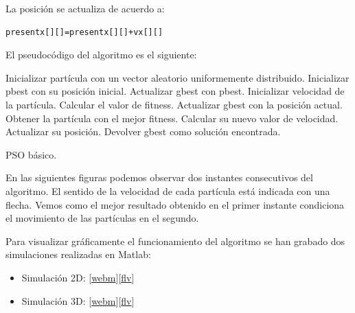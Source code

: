 \documentclass[a4paper,12pt,titlepage]{article}
\begin{document}
La posición se actualiza de acuerdo a:

\begin{lstlisting}
presentx[][]=presentx[][]+vx[][]
\end{lstlisting}

El pseudocódigo del algoritmo es el siguiente:
\newpage

\begin{algorithm}[!ht]
	\begin{algorithmic}[1]
		\STATE Inicializar partícula con un vector aleatorio uniformemente distribuido.
		\STATE Inicializar pbest con su posición inicial.
			\STATE Actualizar gbest con pbest.
		\ENDIF
		\STATE Inicializar velocidad de la partícula.
	\ENDFOR
	\REPEAT 
			\STATE Calcular el valor de fitness.
				\STATE Actualizar gbest con la posición actual.
			\ENDIF
		\ENDFOR
		\STATE Obtener la partícula con el mejor fitness.
			\STATE Calcular su nuevo valor de velocidad.
			\STATE Actualizar su posición.
		\ENDFOR		
	\STATE Devolver gbest como solución encontrada.
	\end{algorithmic}
\caption{PSO básico.}
\label{alg:algoritmoRaro}
\end{algorithm}

En las siguientes figuras podemos observar dos instantes consecutivos del algoritmo. El sentido de la velocidad de cada partícula está indicada con una flecha. Vemos como el mejor resultado obtenido en el primer instante condiciona el movimiento de las partículas en el segundo.

Para visualizar gráficamente el funcionamiento del algoritmo se han grabado dos simulaciones realizadas en Matlab:

\begin{itemize}[noitemsep]
	\item Simulación 2D: [\href{https://raw.githubusercontent.com/davidmigloz/evolutionary-computation/master/T1_PSO/res/pso_demo_3d.webm}{webm}][\href{https://raw.githubusercontent.com/davidmigloz/evolutionary-computation/master/T1_PSO/res/pso_demo_3d.flv}{flv}]
	\item Simulación 3D: [\href{https://raw.githubusercontent.com/davidmigloz/evolutionary-computation/master/T1_PSO/res/pso_demo_2d.webm}{webm}][\href{https://raw.githubusercontent.com/davidmigloz/evolutionary-computation/master/T1_PSO/res/pso_demo_2d.flv}{flv}]
\end{itemize}
\end{document}
